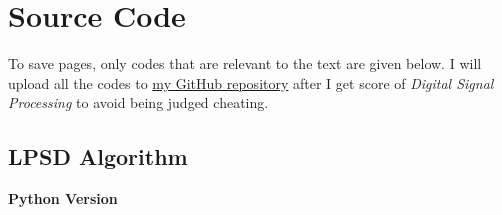 \section{Source Code}


To save pages, only codes that are relevant to the text are given below. I will upload all the codes to \href{https://github.com/iChunyu/signal-process-demo}{my GitHub repository} after I get score of \textsl{Digital Signal Processing} to avoid being judged cheating.




\subsection{LPSD Algorithm}


{\noindent \bfseries Python Version}


